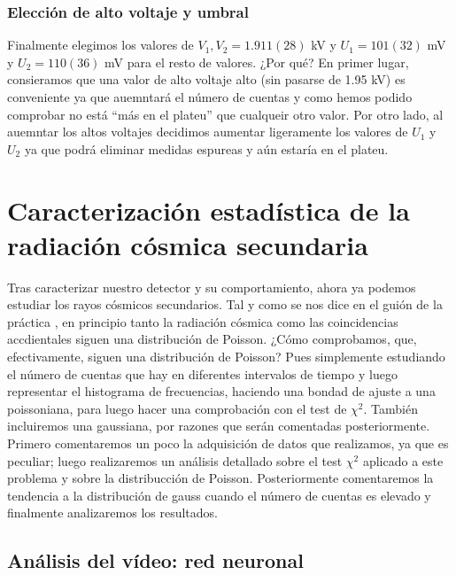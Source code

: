 \documentclass[11pt]{article}
\begin{document}
\subsubsection{Elección de alto voltaje y umbral}

Finalmente elegimos los valores de $V_1,V_2=1.911(28)$ kV y $U_1=101(32)$ mV y $U_2=110(36)$ mV para el resto de valores. ¿Por qué? En primer lugar, consieramos que una valor de alto voltaje alto (sin pasarse de 1.95 kV) es conveniente ya que auemntará el número de cuentas y como hemos podido comprobar no está ``más en el plateu'' que cualqueir otro valor. Por otro lado, al auemntar los altos voltajes decidimos aumentar ligeramente los valores de $U_1$ y $U_2$ ya que podrá eliminar medidas espureas y aún estaría en el plateu. 



\section{Caracterización estadística de la radiación cósmica secundaria} \label{Sec:estadistica}

Tras caracterizar nuestro detector y su comportamiento, ahora ya podemos estudiar los rayos cósmicos secundarios. Tal y como se nos dice en el guión de la práctica \cite{P2}, en principio tanto la radiación cósmica como las coincidencias accdientales siguen una distribución de Poisson. ¿Cómo comprobamos, que, efectivamente, siguen una distribución de Poisson? Pues simplemente estudiando el número de cuentas que hay en diferentes intervalos de tiempo y luego representar el histograma de frecuencias, haciendo una bondad de ajuste a una poissoniana, para luego hacer una comprobación con el test de $\chi^2$. También incluiremos una gaussiana, por razones que serán comentadas posteriormente. Primero comentaremos un poco la adquisición de datos que realizamos, ya que es peculiar; luego realizaremos un análisis detallado sobre el test $\chi^2$ aplicado a este problema y sobre la distribucción de Poisson. Posteriormente comentaremos la tendencia a la distribución de gauss cuando el número de cuentas es elevado y finalmente analizaremos los resultados. 

\subsection{Análisis del vídeo: red neuronal}
\end{document}
